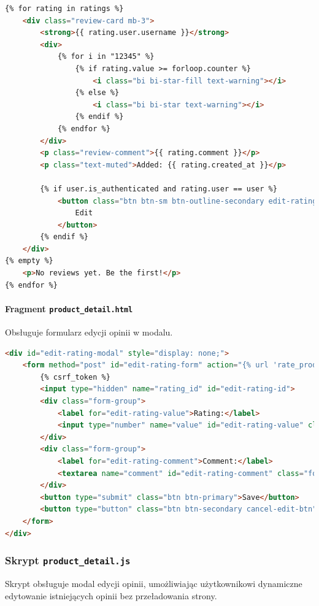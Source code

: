 \documentclass[12pt,a4paper,oneside]{article}
\theoremstyle{definition}
\numberwithin{equation}{section}
\begin{document}
\begin{lstlisting}[language=HTML, caption=Szablon \texttt{rating\_list.html}]
{% for rating in ratings %}
    <div class="review-card mb-3">
        <strong>{{ rating.user.username }}</strong>
        <div>
            {% for i in "12345" %}
                {% if rating.value >= forloop.counter %}
                    <i class="bi bi-star-fill text-warning"></i>
                {% else %}
                    <i class="bi bi-star text-warning"></i>
                {% endif %}
            {% endfor %}
        </div>
        <p class="review-comment">{{ rating.comment }}</p>
        <p class="text-muted">Added: {{ rating.created_at }}</p>

        {% if user.is_authenticated and rating.user == user %}
            <button class="btn btn-sm btn-outline-secondary edit-rating-btn" data-rating-id="{{ rating.id }}">
                Edit
            </button>
        {% endif %}
    </div>
{% empty %}
    <p>No reviews yet. Be the first!</p>
{% endfor %}
\end{lstlisting}

\paragraph{Fragment \texttt{product\_detail.html}}
Obsługuje formularz edycji opinii w modalu.

\begin{lstlisting}[language=HTML, caption=Fragment \texttt{product\_detail.html}]
<div id="edit-rating-modal" style="display: none;">
    <form method="post" id="edit-rating-form" action="{% url 'rate_product' product.id %}" data-product-id="{{ product.id }}">
        {% csrf_token %}
        <input type="hidden" name="rating_id" id="edit-rating-id">
        <div class="form-group">
            <label for="edit-rating-value">Rating:</label>
            <input type="number" name="value" id="edit-rating-value" class="form-control" min="1" max="5" required>
        </div>
        <div class="form-group">
            <label for="edit-rating-comment">Comment:</label>
            <textarea name="comment" id="edit-rating-comment" class="form-control"></textarea>
        </div>
        <button type="submit" class="btn btn-primary">Save</button>
        <button type="button" class="btn btn-secondary cancel-edit-btn">Cancel</button>
    </form>
</div>
\end{lstlisting}



\subsubsection{Skrypt \texttt{product\_detail.js}}
Skrypt obsługuje modal edycji opinii, umożliwiając użytkownikowi dynamiczne edytowanie istniejących opinii bez przeładowania strony.
\end{document}
